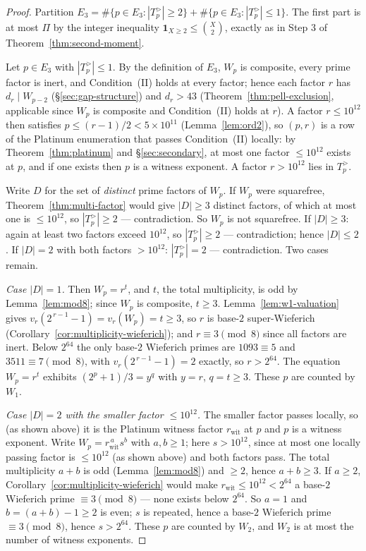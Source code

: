 \documentclass[11pt]{amsart}
\theoremstyle{plain}
\theoremstyle{definition}
\theoremstyle{remark}
\numberwithin{equation}{section}
\begin{document}
\begin{proof}
Partition $E_3 = \#\{p \in E_3 : |T_p^{>}| \geq 2\} + \#\{p \in E_3 : |T_p^{>}| \leq 1\}$. The first part is at most $\Pi$ by the integer inequality $\mathbf{1}_{X \geq 2} \leq \binom{X}{2}$, exactly as in Step 3 of Theorem~\ref{thm:second-moment}.

Let $p \in E_3$ with $|T_p^{>}| \leq 1$. By the definition of $E_3$, $W_p$ is composite, every prime factor is inert, and Condition~(II) holds at every factor; hence each factor $r$ has $d_r \mid W_{p-2}$ (\S\ref{sec:gap-structure}) and $d_r > 43$ (Theorem~\ref{thm:pell-exclusion}, applicable since $W_p$ is composite and Condition~(II) holds at $r$). A factor $r \leq 10^{12}$ then satisfies $p \leq (r-1)/2 < 5 \times 10^{11}$ (Lemma~\ref{lem:ord2}), so $(p, r)$ is a row of the Platinum enumeration that passes Condition~(II) locally: by Theorem~\ref{thm:platinum} and \S\ref{sec:secondary}, at most one factor $\leq 10^{12}$ exists at $p$, and if one exists then $p$ is a witness exponent. A factor $r > 10^{12}$ lies in $T_p^{>}$.

Write $D$ for the set of \emph{distinct} prime factors of $W_p$. If $W_p$ were squarefree, Theorem~\ref{thm:multi-factor} would give $|D| \geq 3$ distinct factors, of which at most one is $\leq 10^{12}$, so $|T_p^{>}| \geq 2$ --- contradiction. So $W_p$ is not squarefree. If $|D| \geq 3$: again at least two factors exceed $10^{12}$, so $|T_p^{>}| \geq 2$ --- contradiction; hence $|D| \leq 2$. If $|D| = 2$ with both factors $> 10^{12}$: $|T_p^{>}| = 2$ --- contradiction. Two cases remain.

\emph{Case $|D| = 1$.} Then $W_p = r^t$, and $t$, the total multiplicity, is odd by Lemma~\ref{lem:mod8}; since $W_p$ is composite, $t \geq 3$. Lemma~\ref{lem:w1-valuation} gives $v_r(2^{\,r-1} - 1) = v_r(W_p) = t \geq 3$, so $r$ is base-$2$ super-Wieferich (Corollary~\ref{cor:multiplicity-wieferich}); and $r \equiv 3 \pmod 8$ since all factors are inert. Below $2^{64}$ the only base-$2$ Wieferich primes are $1093 \equiv 5$ and $3511 \equiv 7 \pmod 8$, with $v_r(2^{\,r-1}-1) = 2$ exactly, so $r > 2^{64}$. The equation $W_p = r^t$ exhibits $(2^p + 1)/3 = y^q$ with $y = r$, $q = t \geq 3$. These $p$ are counted by $W_1$.

\emph{Case $|D| = 2$ with the smaller factor $\leq 10^{12}$.} The smaller factor passes locally, so (as shown above) it is the Platinum witness factor $r_{\mathrm{wit}}$ at $p$ and $p$ is a witness exponent. Write $W_p = r_{\mathrm{wit}}^{\,a} s^b$ with $a, b \geq 1$; here $s > 10^{12}$, since at most one locally passing factor is $\leq 10^{12}$ (as shown above) and both factors pass. The total multiplicity $a + b$ is odd (Lemma~\ref{lem:mod8}) and $\geq 2$, hence $a + b \geq 3$. If $a \geq 2$, Corollary~\ref{cor:multiplicity-wieferich} would make $r_{\mathrm{wit}} \leq 10^{12} < 2^{64}$ a base-$2$ Wieferich prime $\equiv 3 \pmod 8$ --- none exists below $2^{64}$. So $a = 1$ and $b = (a+b) - 1 \geq 2$ is even; $s$ is repeated, hence a base-$2$ Wieferich prime $\equiv 3 \pmod 8$, hence $s > 2^{64}$. These $p$ are counted by $W_2$, and $W_2$ is at most the number of witness exponents.


\end{proof}
\end{document}

